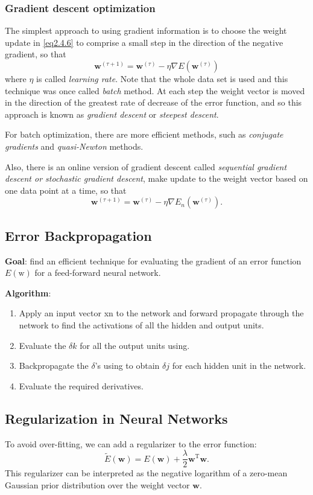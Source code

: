 \documentclass{article}
\newcommand{\mrm}{\mathrm}
\newcommand{\mbf}{\mathbf}
\newcommand{\ww}{\mbf w}
\newcommand{\trans}{^{\mrm T}}
\newcommand{\tit}{\textit}
\begin{document}
\subsubsection*{Gradient descent optimization}
The simplest approach to using gradient information is to choose the weight update in \ref{eq2.4.6} to comprise a small step in the direction of the negative gradient, so
that
\begin{equation}\label{}
  \ww^{(\tau+1)} =\ww^{(\tau)}-\eta\nabla E(\ww^{(\tau)})
\end{equation}
where $\eta$ is called \tit{learning rate}. Note that the whole data set is used and this technique was once called \tit{batch} method. At each step the weight vector is moved in the direction of the greatest rate of decrease of the error function, and so this approach is known as \tit{gradient descent} or \tit{steepest descent}.

For batch optimization, there are more efficient methods, such as \tit{conjugate gradients} and \tit{quasi-Newton} methods.

Also, there is an online version of gradient descent called \tit{sequential gradient descent or stochastic gradient descent}, make update to the weight vector based on one data point at a time, so that
\begin{equation}\label{}
  \ww^{(\tau+1)}=\ww^{(\tau)} -\eta\nabla E_n(\ww^{(\tau)}).
\end{equation}

\subsection{Error Backpropagation}
\textbf{Goal}: find an efficient technique for evaluating  the gradient of an error function $E(\mathrm w)$ for a feed-forward neural network.

\textbf{Algorithm}:
\begin{enumerate}
  \item Apply an input vector xn to the network and forward propagate through the network to find the activations of all the hidden and output units.
  \item Evaluate the $\delta k$ for all the output units using.
  \item Backpropagate the $\delta$’s using to obtain $\delta j$ for each hidden unit in the network.
  \item Evaluate the required derivatives.
\end{enumerate}

\subsection{Regularization in Neural Networks}
To avoid over-fitting, we can add a regularizer to the error function:
\begin{equation}\label{}
  \tilde{E}(\ww) = E(\ww)+\frac{\lambda}{2}\ww\trans\ww.
\end{equation}
This regularizer can be interpreted as the negative logarithm of a zero-mean Gaussian prior distribution over the weight vector $\ww$.
\end{document}
